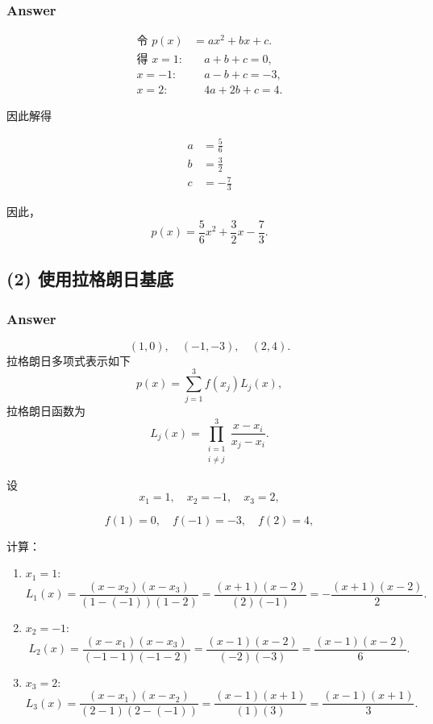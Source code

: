 \documentclass[11pt]{article}
\begin{document}
\subsubsection{Answer}\label{answer}

\[
\begin{aligned}
\text{令 } p(x)&=ax^2+bx+c.\\[1mm]
\text{得 } x=1:&\quad a+b+c=0,\\[1mm]
x=-1:&\quad a-b+c=-3,\\[1mm]
x=2:&\quad 4a+2b+c=4.
\end{aligned}
\]

因此解得

\[
\begin{aligned}
a &= \frac{5}{6} \\
b &= \frac{3}{2} \\
c &= -\frac{7}{3}
\end{aligned}
\]

因此， \[
\boxed{
p(x)=\frac{5}{6}x^2+\frac{3}{2}x-\frac{7}{3}.
}
\]

\subsection{(2)
使用拉格朗日基底}\label{ux4f7fux7528ux62c9ux683cux6717ux65e5ux57faux5e95}

\subsubsection{Answer}\label{answer-1}

\[
(1,0),\quad (-1,-3),\quad (2,4).
\] 拉格朗日多项式表示如下 \[
p(x)=\sum_{j=1}^3 f(x_j)L_j(x),
\] 拉格朗日函数为 \[
L_j(x)=\prod_{\substack{i=1 \\ i\neq j}}^{3}\frac{x-x_i}{x_j-x_i}.
\]

设 \[
x_1=1,\quad x_2=-1,\quad x_3=2,
\]

\[
f(1)=0,\quad f(-1)=-3,\quad f(2)=4,
\]

计算：

\begin{enumerate}
\def\labelenumi{\arabic{enumi}.}
\item
  \(x_1=1\): \[
  L_1(x)=\frac{(x-x_2)(x-x_3)}{(1-(-1))(1-2)}=\frac{(x+1)(x-2)}{(2)(-1)}=-\frac{(x+1)(x-2)}{2}.
  \]
\item
  \(x_2=-1\): \[
  L_2(x)=\frac{(x-x_1)(x-x_3)}{(-1-1)(-1-2)}=\frac{(x-1)(x-2)}{(-2)(-3)}=\frac{(x-1)(x-2)}{6}.
  \]
\item
  \(x_3=2\): \[
  L_3(x)=\frac{(x-x_1)(x-x_2)}{(2-1)(2-(-1))}=\frac{(x-1)(x+1)}{(1)(3)}=\frac{(x-1)(x+1)}{3}.
  \]
\end{enumerate}
\end{document}
